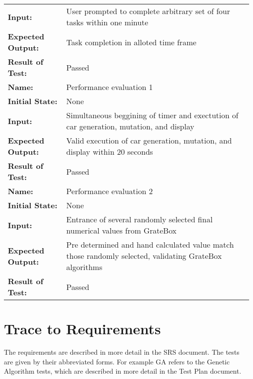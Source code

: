 \documentclass[12pt, titlepage]{article}
\begin{document}
\begin{center}
\begin{longtable}{ l | p{10cm} }
\textbf{Input:} & User prompted to complete arbitrary set of four tasks within one minute\\
\textbf{Expected Output:} & Task completion in alloted time frame\\[0.6em]
\textbf{Result of Test:} & Passed\\
\hline
\rule{0pt}{1.5em}\textbf{Name:} & Performance evaluation 1\\
\textbf{Initial State:} & None\\
\textbf{Input:} & Simultaneous beggining of timer and exectution of car generation, mutation, and display\\
\textbf{Expected Output:} & Valid execution of car generation, mutation, and display within 20 seconds\\[0.6em]
\textbf{Result of Test:} & Passed\\
\hline
\rule{0pt}{1.5em}\textbf{Name:} & Performance evaluation 2\\
\textbf{Initial State:} & None\\
\textbf{Input:} & Entrance of several randomly selected final numerical values from GrateBox\\
\textbf{Expected Output:} & Pre determined and hand calculated value match those randomly selected, validating GrateBox algorithms\\[0.6em]
\textbf{Result of Test:} & Passed\\
\end{longtable}
\end{center}

\section{Trace to Requirements}

The requirements are described in more detail in the SRS document. The tests are 
given by their abbreviated forms. For example GA refers to the Genetic Algorithm 
tests, which are described in more detail in the Test Plan document.
		
\end{document}
